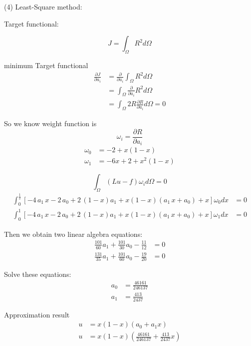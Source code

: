 \documentclass{article}%
\begin{document}
(4) Least-Square method:

Target functional:%

\[
J=\int_{\Omega}R^{2}d\Omega
\]


minimum Target functional%
\begin{align*}
\frac{\partial J}{\partial a_{i}}  &  =\frac{\partial}{\partial a_{i}}%
\int_{\Omega}R^{2}d\Omega\\
&  =\int_{\Omega}\frac{\partial}{\partial a_{i}}R^{2}d\Omega\\
&  =\int_{\Omega}2R\frac{\partial R}{\partial a_{i}}d\Omega=0
\end{align*}


So we know weight function is%
\[
\omega_{i}=\frac{\partial R}{\partial a_{i}}%
\]%
\begin{align*}
\omega_{0}  &  =-2+x\left(  1-x\right) \\
\omega_{1}  &  =-6x+2+x^{2}\left(  1-x\right)
\end{align*}
%

\[
\int_{\Omega}\left(  Lu-f\right)  \omega_{i}d\Omega=0
\]%
\begin{align*}
\int_{0}^{\frac{1}{2}}\left[  -4\,a_{1}\,x-2\,a_{0}+2\,\left(  1-x\right)
a_{1}+x\left(  1-x\right)  \left(  a_{1}\,x+a_{0}\right)  +x\right]
\omega_{0}dx  &  =0\\
\int_{0}^{1}\left[  -4\,a_{1}\,x-2\,a_{0}+2\,\left(  1-x\right)
a_{1}+x\left(  1-x\right)  \left(  a_{1}\,x+a_{0}\right)  +x\right]
\omega_{1}dx  &  =0
\end{align*}


Then we obtain two linear algebra equations:%
\begin{align*}
\frac{101}{60}a_{1}+\frac{101}{30}a_{0}-\frac{11}{12}  &  =0\\
\frac{131}{35}a_{1}+\frac{101}{60}a_{0}-\frac{19}{20}  &  =0
\end{align*}


Solve these equations:%
\begin{align*}
a_{0}  &  =\frac{46161}{246137}\\
a_{1}  &  =\frac{413}{2437}%
\end{align*}


Approximation result%
\begin{align*}
u  &  =x\left(  1-x\right)  \left(  a_{0}+a_{1}x\right) \\
u  &  =x\left(  1-x\right)  \left(  \frac{46161}{246137}+\frac{413}%
{2437}x\right)
\end{align*}
\end{document}
